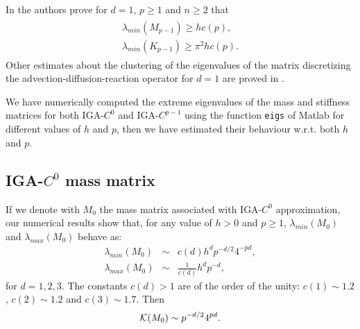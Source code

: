 \documentclass[11pt]{article}
\begin{document}
In \cite{gmpscs} the authors prove for $d=1$, $p\geq 1$ and $n\geq 2$ that
\begin{eqnarray}\label{stime_gmpscs}
\begin{array}{l}
\lambda_{min}(M_{p-1})\geq h c(p),\\
\lambda_{min}(K_{p-1})\geq \pi^2 h c(p).
\end{array}
\end{eqnarray}
Other estimates about the clustering of the 
eigenvalues of the matrix discretizing the advection-diffusion-reaction
operator for $d=1$ are proved in \cite{gmpscs}.



\null
We have numerically computed the extreme eigenvalues of the mass and 
stiffness matrices for both IGA-$C^0$ and IGA-$C^{p-1}$ using the function 
{\tt eigs} of Matlab for different values
of $h$ and $p$, then we have estimated their behaviour w.r.t. both $h$ and $p$.


\subsection{IGA-$C^0$ mass matrix}

If we denote with $M_0$ the mass matrix associated with IGA-$C^0$ approximation,
our numerical results show that, for any value of $h>0$ and $p\geq 1$,
 $\lambda_{min}(M_0)$ and
$\lambda_{max}(M_0)$
behave as:
\begin{eqnarray}
\label{eigminM_C0}
\lambda_{min}(M_0)&\sim &c(d) h^dp^{-d/2}4^{-pd},\\
\label{eigmaxM_C0}
\lambda_{max}(M_0)& \sim &\displaystyle\frac{1}{c(d)}h^dp^{-d},
\end{eqnarray}
for $d=1,2,3$. The constants $c(d)>1$ are of the order of
the unity: $c(1)\sim 1.2$, $c(2)\sim 1.2$ and $c(3)\sim 1.7$.
Then
\begin{equation}\label{condM_C0}
{\cal K}(M_0)\sim p^{-d/2} 4^{pd}.
\end{equation}


\end{document}
